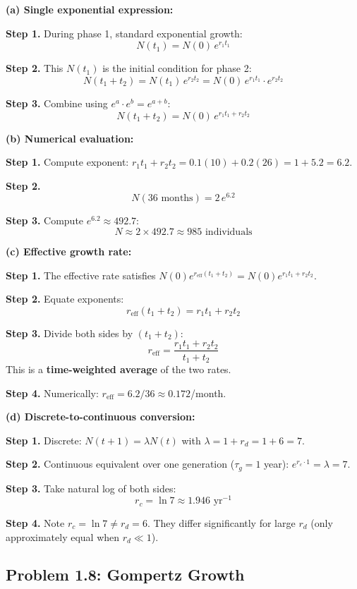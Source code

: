 \documentclass[10pt]{article}
\begin{document}
\begin{solution}
\textbf{(a) Single exponential expression:}

\textbf{Step 1.} During phase 1, standard exponential growth:
\[
N(t_1) = N(0)\,e^{r_1 t_1}
\]

\textbf{Step 2.} This $N(t_1)$ is the initial condition for phase 2:
\[
N(t_1 + t_2) = N(t_1)\,e^{r_2 t_2} = N(0)\,e^{r_1 t_1}\cdot e^{r_2 t_2}
\]

\textbf{Step 3.} Combine using $e^a\cdot e^b = e^{a+b}$:
\[
\boxed{N(t_1+t_2) = N(0)\,e^{r_1 t_1 + r_2 t_2}}
\]

\medskip\textbf{(b) Numerical evaluation:}

\textbf{Step 1.} Compute exponent: $r_1 t_1 + r_2 t_2 = 0.1(10) + 0.2(26) = 1 + 5.2 = 6.2$.

\textbf{Step 2.}
\[
N(36\text{ months}) = 2\,e^{6.2}
\]

\textbf{Step 3.} Compute $e^{6.2} \approx 492.7$:
\[
N \approx 2 \times 492.7 \approx 985 \text{ individuals}
\]

\medskip\textbf{(c) Effective growth rate:}

\textbf{Step 1.} The effective rate satisfies $N(0)e^{r_{\text{eff}}(t_1+t_2)} = N(0)e^{r_1 t_1 + r_2 t_2}$.

\textbf{Step 2.} Equate exponents:
\[
r_{\text{eff}}(t_1+t_2) = r_1 t_1 + r_2 t_2
\]

\textbf{Step 3.} Divide both sides by $(t_1+t_2)$:
\[
\boxed{r_{\text{eff}} = \frac{r_1 t_1 + r_2 t_2}{t_1+t_2}}
\]
This is a \textbf{time-weighted average} of the two rates.

\textbf{Step 4.} Numerically: $r_{\text{eff}} = 6.2/36 \approx 0.172$/month.

\medskip\textbf{(d) Discrete-to-continuous conversion:}

\textbf{Step 1.} Discrete: $N(t+1) = \lambda N(t)$ with $\lambda = 1 + r_d = 1 + 6 = 7$.

\textbf{Step 2.} Continuous equivalent over one generation ($\tau_g = 1$ year): $e^{r_c \cdot 1} = \lambda = 7$.

\textbf{Step 3.} Take natural log of both sides:
\[
r_c = \ln 7 \approx 1.946\text{ yr}^{-1}
\]

\textbf{Step 4.} Note $r_c = \ln 7 \neq r_d = 6$. They differ significantly for large $r_d$ (only approximately equal when $r_d \ll 1$).
\end{solution}

\subsection{Problem 1.8: Gompertz Growth}
\end{document}
